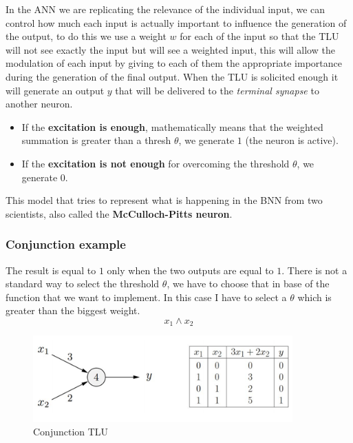 \documentclass{article}
\begin{document}
In the ANN we are replicating the relevance of the individual input, we can control how much each input is actually
important to influence the generation of the output, to do this we use a weight $w$ for each of the input so
that the TLU will not see exactly the input but will see a weighted input, this will allow the modulation of
each input by giving to each of them the appropriate importance during the generation of the final output.
\newline\newline
When the TLU is solicited enough it will generate an output $y$ that will be delivered to the \textit{terminal synapse}
to another neuron.
\begin{itemize}
    \item If the \textbf{excitation is enough}, mathematically means that the weighted summation is greater
          than a thresh $\theta$, we generate $1$ (the neuron is active).
    \item If the \textbf{excitation is not enough} for overcoming the threshold $\theta$, we generate $0$.
\end{itemize}
This model that tries to represent what is happening in the BNN from two scientists, also called the \textbf{McCulloch-Pitts neuron}.
\subsubsection{Conjunction example}
The result is equal to $1$ only when the two outputs are equal to $1$.
There is not a standard way to select the threshold $\theta$, we have to choose that in base of the
function that we want to implement. In this case I have to select a $\theta$ which is greater than the biggest weight.
$$x_1\land x_2$$
\begin{figure}[H]
    \centering
    \includegraphics[width=10cm]{images/conj_TLU.png}
    \caption{Conjunction TLU}
    \label{fig:tlu_conjunction}
\end{figure}
\end{document}
